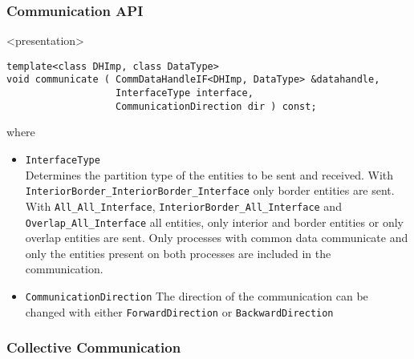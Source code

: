 \begin{frame}[fragile]
  \frametitle<presentation>{Communication API}
  \begin{onlyenv}<presentation>
\lstset{basicstyle=\scriptsize\ttfamily}
    \begin{lstlisting}
template<class DHImp, class DataType>
void communicate ( CommDataHandleIF<DHImp, DataType> &datahandle,
                   InterfaceType interface,
                   CommunicationDirection dir ) const;
    \end{lstlisting}
\lstset{basicstyle=\normalsize\ttfamily}
where
    \end{onlyenv}
    \begin{itemize}
    \item \lstinline!InterfaceType!\\
    Determines the partition type of the entities to be sent and received. With \lstinline!InteriorBorder_InteriorBorder_Interface! only
border entities are sent. With \lstinline!All_All_Interface!,
    \lstinline!InteriorBorder_All_Interface! and
    \lstinline!Overlap_All_Interface! all entities, only interior and border entities or only overlap entities are sent. Only processes with common
data communicate and only the entities present on both processes are included in the communication.
    \item \lstinline!CommunicationDirection!
      The direction of the communication can be changed with either \lstinline!ForwardDirection! or
      \lstinline!BackwardDirection!
    \end{itemize}
\end{frame}



\subsubsection{Collective Communication}

